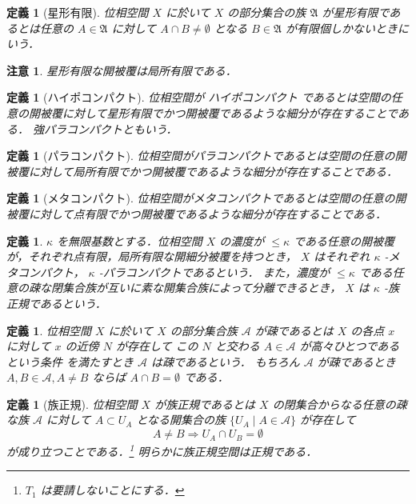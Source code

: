 \documentclass[leqno, 12pt]{ltjsarticle}
\newtheorem{df}[thm]{定義}
\newtheorem*{rmk}{注意}
\newcommand{\To}{\Longrightarrow}
\begin{document}
\begin{df}[星形有限]
位相空間
$X$
に於いて
$X$
の部分集合の族
$\mathfrak{A}$
が星形有限であるとは任意の
$A\in \mathfrak{A}$
に対して
$A\cap B\neq\emptyset$
となる
$B\in \mathfrak{A}$
が有限個しかないときにいう．
\end{df}

\begin{rmk}
星形有限な開被覆は局所有限である．
\end{rmk}


\begin{df}[ハイポコンパクト]
位相空間が
ハイポコンパクト
であるとは空間の任意の開被覆に対して星形有限でかつ開被覆であるような細分が存在することである．
強パラコンパクトともいう．
\end{df}

\begin{df}[パラコンパクト]
位相空間がパラコンパクトであるとは空間の任意の開被覆に対して局所有限でかつ開被覆であるような細分が存在することである．
\end{df}

\begin{df}[メタコンパクト]
位相空間がメタコンパクトであるとは空間の任意の開被覆に対して点有限でかつ開被覆であるような細分が存在することである．
\end{df}

\begin{df}
$\kappa$
を無限基数とする．位相空間
$X$
の濃度が
$\le \kappa$
である任意の開被覆が，それぞれ点有限，局所有限な開細分被覆を持つとき，
$X$
はそれぞれ
$\kappa$
-メタコンパクト，
$\kappa$
-パラコンパクトであるという．
また，濃度が
$\le \kappa$
である任意の疎な閉集合族が互いに素な開集合族によって分離できるとき，
$X$
は
$\kappa$
-族正規であるという．
\end{df}


\begin{df}
位相空間
$X$
に於いて
$X$
の部分集合族
$\mathcal{A}$
が疎であるとは
$X$
の各点
$x$
に対して
$x$
の近傍
$N$
が存在して
この
$N$
と交わる
$A\in\mathcal{A}$
が高々ひとつであるという条件
を満たすとき
$\mathcal{A}$
は疎であるという．
もちろん
$\mathcal{A}$
が疎であるとき
$A,B\in \mathcal{A},A\neq B$
ならば
$A\cap B=\emptyset$
である．
\end{df}

\begin{df}[族正規]
位相空間
$X$
が族正規であるとは
$X$
の閉集合からなる任意の疎な族
$\mathcal{A}$
に対して
$A\subset U_{A}$
となる開集合の族
$\{U_{A} \mid A\in \mathcal{A}\}$
が存在して
\[
A\neq B\To U_{A}\cap U_{B}=\emptyset
\]
が成り立つことである．\footnote{
$T_{1}$
は要請しないことにする．}
明らかに族正規空間は正規である．
\end{df}
\end{document}
